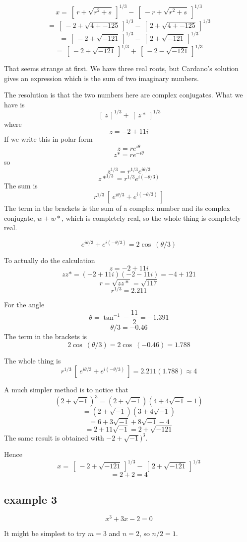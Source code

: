 \documentclass[11pt, oneside]{article}
\begin{document}
\[ x = \ [ \ r + \sqrt{r^2 + s} \ ]^{1/3} - \ [ \ -r + \sqrt{r^2 + s} \ ]^{1/3} \]
\[ = \ [ \ -2 + \sqrt{4 + -125} \ ]^{1/3} - \ [ \ 2 + \sqrt{4 + -125} \ ]^{1/3} \]
\[ = \ [ \ -2 + \sqrt{-121} \ ]^{1/3} - \ [ \ 2 + \sqrt{-121} \ ]^{1/3} \]
\[ = \ [ \ -2 + \sqrt{-121} \ ]^{1/3} + \ [ \ - 2 - \sqrt{-121} \ ]^{1/3} \]

That seems strange at first.  We have three real roots, but Cardano's solution gives an expression which is the sum of two imaginary numbers.

The resolution is that the two numbers here are complex conjugates.  What we have is
\[ \ [ \ z \ ]^{1/3} + \ [ \ z* \ ]^{1/3} \]
where
\[ z = -2 + 11 i \]
If we write this in polar form
\[ z = re^{i\theta} \]
\[ z* = re^{-i \theta} \]
so
\[ z^{1/3} = r^{1/3} e^{i \theta/3} \]
\[ z*^{1/3} =  r^{1/3} e^{i(-\theta/3)} \]
The sum is
\[ r^{1/3} \ [ \ e^{i \theta/3} + e^{i(-\theta/3)}  \ ] \]
The term in the brackets is the sum of a complex number and its complex conjugate, $w + w*$, which is completely real, so the whole thing is completely real.

\[ e^{i \theta/3} + e^{i(-\theta/3)} = 2 \cos \ (\theta/3) \]

To actually do the calculation
\[ z = -2 + 11 i \]
\[ zz* = (-2 + 11i)(-2 - 11i) = -4 + 121 \]
\[ r = \sqrt{zz*} = \sqrt{117} \]
\[ r^{1/3} = 2.211 \]

For the angle
\[ \theta = \tan^{-1} -\frac{11}{2} = - 1.391 \]
\[ \theta/3 =  - 0.46 \]
The term in the brackets is
\[ 2 \cos \ (\theta/3) = 2 \cos \ (- 0.46) = 1.788  \]

The whole thing is
\[ r^{1/3} \ [ \ e^{i \theta/3} + e^{i(-\theta/3)}  \ ]  = 2.211(1.788) \approx 4  \]

A much simpler method is to notice that
\[ (2 + \sqrt{-1})^3 = (2 + \sqrt{-1}) (4 + 4 \sqrt{-1} - 1) \]
\[ =  (2 + \sqrt{-1}) (3 + 4 \sqrt{-1} ) \]
\[ = 6 + 3  \sqrt{-1} + 8  \sqrt{-1} - 4 \]
\[ = 2 + 11 \sqrt{-1} = 2 + \sqrt{-121} \]
The same result is obtained with $-2 + \sqrt{-1})^3$.

Hence 
\[ x = \ [ \ -2 + \sqrt{-121} \ ]^{1/3} - \ [ \ 2 + \sqrt{-121} \ ]^{1/3} \]
\[ = 2 + 2 = 4 \]

\subsection*{example 3}
\[ x^3 + 3x - 2 = 0 \]

It might be simplest to try $m=3$ and $n = 2$, so $n/2 = 1$.
\end{document}
